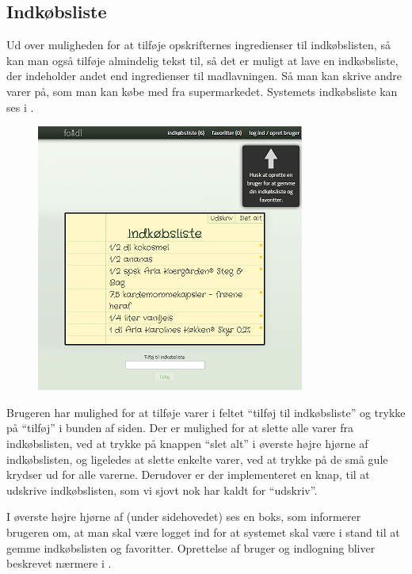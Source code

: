 \subsection{Indkøbsliste}
\label{subsec:brug-indkobsliste}

Ud over muligheden for at tilføje opskrifternes ingredienser til indkøbslisten, så kan man også tilføje almindelig tekst til, så det er muligt at lave en indkøbsliste, der indeholder andet end ingredienser til madlavningen. Så man kan skrive andre varer på, som man kan købe med fra \fx supermarkedet. Systemets indkøbsliste kan ses i .

\begin{figure}[H]
	\centering
	\includegraphics[scale=1]{billeder/foodl/thumbnails/indkoebsliste.png}
	\label{fig:overblik-indkoebsliste}
\end{figure}

Brugeren har mulighed for at tilføje varer i feltet ``tilføj til indkøbsliste'' og trykke på ``tilføj'' i bunden af siden. Der er mulighed for at slette alle varer fra indkøbslisten, ved at trykke på knappen ``slet alt'' i øverste højre hjørne af indkøbslisten, og ligeledes at slette enkelte varer, ved at trykke på de små gule krydser ud for alle varerne. Derudover er der implementeret en knap, til at udskrive indkøbslisten, som vi sjovt nok har kaldt for ``udskriv''.

I øverste højre hjørne af  (under sidehovedet) ses en boks, som informerer brugeren om, at man skal være logget ind for at systemet skal være i stand til at gemme indkøbslisten og favoritter. Oprettelse af bruger og indlogning bliver beskrevet nærmere i .

